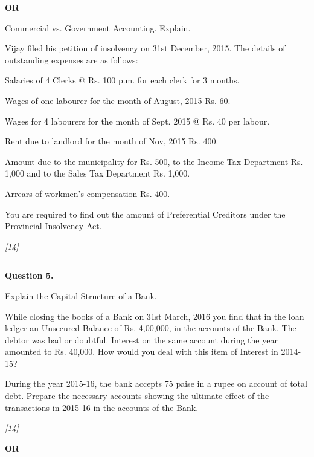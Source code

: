 \documentclass[11pt,a4paper]{article}
\newcommand{\pts}[1]{\hfill   \textit{[#1]}}
\begin{document}
\centerline{   \textbf{OR}}


\begin{parts}
  \item Commercial vs. Government Accounting. Explain.
  \item Vijay filed his petition of insolvency on 31st December, 2015. The details of outstanding expenses are as follows:
  
\begin{parts}
    \item Salaries of 4 Clerks @ Rs. 100 p.m. for each clerk for 3 months.
    \item Wages of one labourer for the month of August, 2015 Rs. 60.
    \item Wages for 4 labourers for the month of Sept. 2015 @ Rs. 40 per labour.
    \item Rent due to landlord for the month of Nov, 2015 Rs. 400.
    \item Amount due to the municipality for Rs. 500, to the Income Tax Department Rs. 1,000 and to the Sales Tax Department Rs. 1,000.
    \item Arrears of workmen's compensation Rs. 400.
  \end{parts}
  You are required to find out the amount of Preferential Creditors under the Provincial Insolvency Act.
\end{parts}\pts{14}

\medskip\rule{\linewidth}{0.2pt}

\pagebreak




\noindent   \textbf{Question 5.}

\begin{parts}
  \item Explain the Capital Structure of a Bank.
  \item While closing the books of a Bank on 31st March, 2016 you find that in the loan ledger an Unsecured Balance of Rs. 4,00,000, in the accounts of the Bank. The debtor was bad or doubtful. Interest on the same account during the year amounted to Rs. 40,000. How would you deal with this item of Interest in 2014-15?
  
  During the year 2015-16, the bank accepts 75 paise in a rupee on account of total debt. Prepare the necessary accounts showing the ultimate effect of the transactions in 2015-16 in the accounts of the Bank.
\end{parts}\pts{14}

\centerline{   \textbf{OR}}
\end{document}
